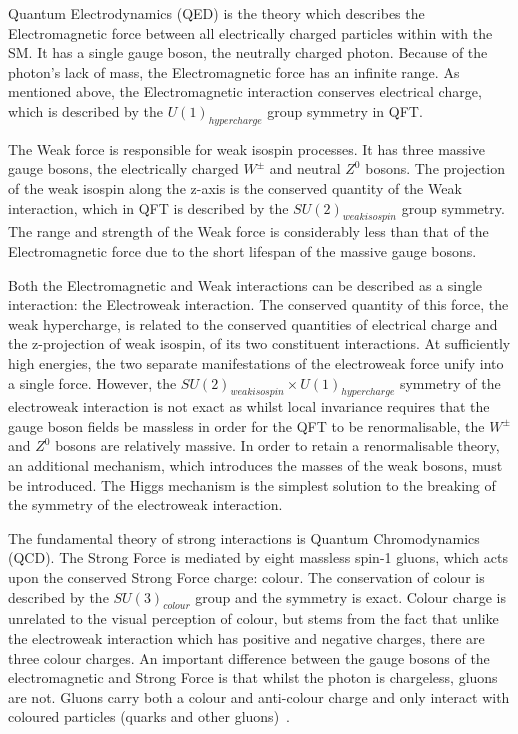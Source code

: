 Quantum Electrodynamics (QED) is the theory which describes the Electromagnetic force between all electrically charged particles within with the SM. 
It has a single gauge boson, the neutrally charged photon. 
Because of the photon's lack of mass, the Electromagnetic force has an infinite range. 
As mentioned above, the Electromagnetic interaction conserves electrical charge, which is described by the $U(1)_{hypercharge}$ group symmetry in QFT\cite{QFT}. 

The Weak force is responsible for weak isospin processes. 
It has three massive gauge bosons, the electrically charged $W^{\pm}$ and neutral $Z^{0}$ bosons. 
The projection of the weak isospin along the z-axis is the conserved quantity of the Weak interaction, which in QFT is described by the $SU(2)_{weak isospin}$ group symmetry. 
The range and strength of the Weak force is considerably less than that of the Electromagnetic force due to the short lifespan of the massive gauge bosons\cite{ElectroweakStrong}. 

Both the Electromagnetic and Weak interactions can be described as a single interaction: the Electroweak interaction. 
The conserved quantity of this force, the weak hypercharge, is related to the conserved quantities of electrical charge and the z-projection of weak isospin, of its two constituent interactions. 
At sufficiently high energies, the two separate manifestations of the electroweak force unify into a single force. 
However, the $SU(2)_{weak isospin} \times U(1)_{hypercharge}$ symmetry of the electroweak interaction is not exact as whilst local invariance requires that the gauge boson fields be massless in order for the QFT to be renormalisable, the $W^{\pm}$ and $Z^{0}$ bosons are relatively massive. 
In order to retain a renormalisable theory, an additional mechanism, which introduces the masses of the weak bosons, must be introduced. 
The Higgs mechanism is the simplest solution to the breaking of the symmetry of the electroweak interaction\cite{LagrangiansSM}. 

The fundamental theory of strong interactions is Quantum Chromodynamics (QCD). 
The Strong Force is mediated by eight massless spin-1 gluons, which acts upon the conserved Strong Force charge: colour\cite{ElectroweakStrong}. 
The conservation of colour is described by the $SU(3)_{colour}$ group and the symmetry is exact. 
Colour charge is unrelated to the visual perception of colour, but stems from the fact that unlike the electroweak interaction which has positive and negative charges, there are three colour charges. 
An important difference between the gauge bosons of the electromagnetic and Strong Force is that whilst the photon is chargeless, gluons are not. 
Gluons carry both a colour and anti-colour charge and only interact with coloured particles (quarks and other gluons)~\cite{ElectroweakStrong}. 

